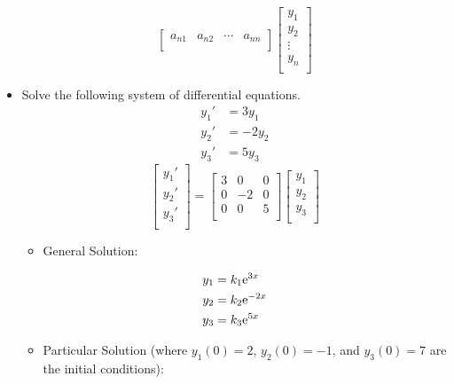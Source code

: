 \documentclass{article}
\begin{document}
\begin{itemize}
\begin{equation*}
\begin{bmatrix}
            a_{n1} & a_{n2} & \cdots & a_{nn}\\
        \end{bmatrix}
        \begin{bmatrix}
            y_1\\
            y_2\\
            \vdots\\
            y_n\\
        \end{bmatrix}
    \end{equation*}
    \item Solve the following system of differential equations.
    \begin{align*}
        y_1' &= 3y_1\\
        y_2' &= -2y_2\\
        y_3' &= 5y_3
    \end{align*}
    \begin{equation*}
        \begin{bmatrix}
            y_1'\\
            y_2'\\
            y_3'\\
        \end{bmatrix}
        =
        \begin{bmatrix}
            3 & 0 & 0\\
            0 & -2 & 0\\
            0 & 0 & 5\\
        \end{bmatrix}
        \begin{bmatrix}
            y_1\\
            y_2\\
            y_3\\
        \end{bmatrix}
    \end{equation*}
    \begin{itemize}
        \item General Solution:
    \end{itemize}
    \begin{align*}
        y_1 &= k_1\text{e}^{3x}\\
        y_2 &= k_2\text{e}^{-2x}\\
        y_3 &= k_3\text{e}^{5x}
    \end{align*}
    \begin{itemize}
        \item Particular Solution (where $y_1(0)=2$, $y_2(0)=-1$, and $y_3(0)=7$ are the initial conditions):

\end{itemize}
\end{itemize}
\end{document}
